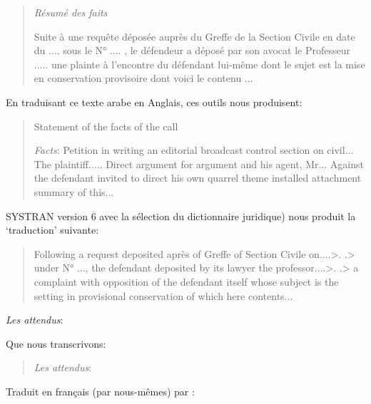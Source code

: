 \documentclass[french]{textolivre}
\begin{document}
\begin{quote}
\emph{Résumé des faits}

Suite à une requête déposée auprès du Greffe de la Section Civile en date du .... sous le N° .... , le défendeur a déposé par son avocat le Professeur ..... une plainte à l’encontre du défendant lui-même dont le sujet est la mise en conservation provisoire dont voici le contenu ...
\end{quote}

En traduisant ce texte arabe en Anglais, ces outils nous produisent:

\begin{quote}
Statement of the facts of the call

\emph{Facts}:
Petition in writing an editorial broadcast control section on civil... The plaintiff..... Direct argument for argument and his agent, Mr... Against the defendant invited to direct his own quarrel theme installed attachment summary of this...
\end{quote}

SYSTRAN version 6 avec la sélection du dictionnaire juridique) nous produit la ‘traduction’ suivante:

\begin{quote}
Following a request deposited après of Greffe of Section Civile on....>. .> under N° ..., the defendant deposited by its lawyer the professor....>. .> a complaint with opposition of the defendant itself whose subject is the setting in provisional conservation of which here contents...
\end{quote}

\emph{Les attendus}:

\begin{quote}
\end{quote}

Que nous transcrivons: 

\begin{quote}
\emph{Les attendus}:     
\end{quote}


Traduit en français (par nous-mêmes) par :
\end{document}

